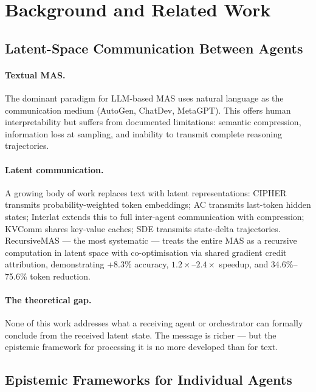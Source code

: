 \documentclass[11pt,a4paper]{article}
\theoremstyle{plain}
\theoremstyle{definition}
\theoremstyle{remark}
\begin{document}
\section{Background and Related Work}

\subsection{Latent-Space Communication Between Agents}

\paragraph{Textual MAS.} The dominant paradigm for LLM-based MAS uses natural
language as the communication medium (AutoGen, ChatDev, MetaGPT). This offers
human interpretability but suffers from documented limitations: semantic
compression, information loss at sampling, and inability to transmit complete
reasoning trajectories.

\paragraph{Latent communication.} A growing body of work replaces text with latent
representations: CIPHER transmits probability-weighted token embeddings; AC
transmits last-token hidden states; Interlat extends this to full inter-agent
communication with compression; KVComm shares key-value caches; SDE transmits
state-delta trajectories. RecursiveMAS \cite{yang2026} --- the most systematic ---
treats the entire MAS as a recursive computation in latent space with
co-optimisation via shared gradient credit attribution, demonstrating +8.3\%
accuracy, $1.2\times$--$2.4\times$ speedup, and 34.6\%--75.6\% token reduction.

\paragraph{The theoretical gap.} None of this work addresses what a receiving agent
or orchestrator can formally conclude from the received latent state. The message
is richer --- but the epistemic framework for processing it is no more developed
than for text.

\subsection{Epistemic Frameworks for Individual Agents}
\end{document}
